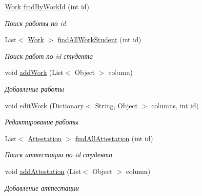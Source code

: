 \begin{DoxyCompactItemize}
\mbox{\hyperlink{classpatterns_kursach_1_1_work}{Work}} \mbox{\hyperlink{classpatterns_kursach_1_1data_mapper_1_1_student_mapper_ade29783b17cd615f565ccf2869eff1a4}{find\+By\+Work\+Id}} (int id)
\begin{DoxyCompactList}\small\item\em Поиск работы по id \end{DoxyCompactList}\item 
List$<$ \mbox{\hyperlink{classpatterns_kursach_1_1_work}{Work}} $>$ \mbox{\hyperlink{classpatterns_kursach_1_1data_mapper_1_1_student_mapper_ab57ac4e8d4c89e55cc07d3200a8cb306}{find\+All\+Work\+Student}} (int id)
\begin{DoxyCompactList}\small\item\em Поиск работ по id студента \end{DoxyCompactList}\item 
void \mbox{\hyperlink{classpatterns_kursach_1_1data_mapper_1_1_student_mapper_ad5ade2f61c321ca510cc9c2b8d008ed4}{add\+Work}} (List$<$ Object $>$ column)
\begin{DoxyCompactList}\small\item\em Добавление работы \end{DoxyCompactList}\item 
void \mbox{\hyperlink{classpatterns_kursach_1_1data_mapper_1_1_student_mapper_ab960f10607151d2e1977da75acfcf623}{edit\+Work}} (Dictionary$<$ String, Object $>$ columns, int id)
\begin{DoxyCompactList}\small\item\em Редактирование работы \end{DoxyCompactList}\item 
List$<$ \mbox{\hyperlink{classpatterns_kursach_1_1_attestation}{Attestation}} $>$ \mbox{\hyperlink{classpatterns_kursach_1_1data_mapper_1_1_student_mapper_a631ede448eb4b973717ced3ed46a1d76}{find\+All\+Attestation}} (int id)
\begin{DoxyCompactList}\small\item\em Поиск аттестации по id студента \end{DoxyCompactList}\item 
void \mbox{\hyperlink{classpatterns_kursach_1_1data_mapper_1_1_student_mapper_adabac96ea56737cf64dbc4262dd83f28}{add\+Attestation}} (List$<$ Object $>$ column)
\begin{DoxyCompactList}\small\item\em Добавление аттестации \end{DoxyCompactList}\item 

\end{DoxyCompactItemize}
